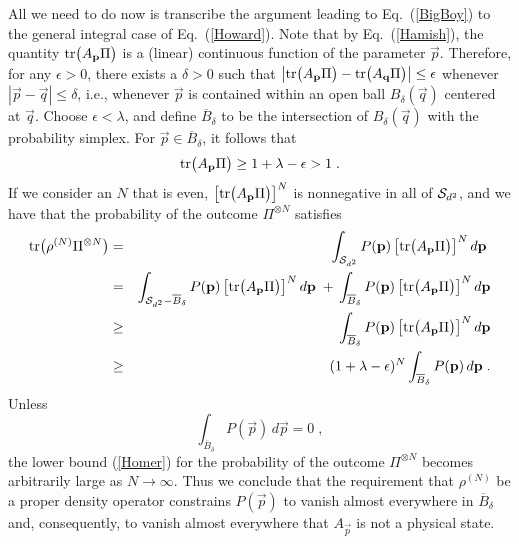 All we need to do now is transcribe the argument leading to
Eq.~(\ref{BigBoy}) to the general integral case of
Eq.~(\ref{Howard}). Note that by Eq.~(\ref{Hamish}), the quantity
${\rm tr}\big(A_{\vec{p}}\Pi\big)$ is a (linear) continuous
function of the parameter $\vec{p}$.  Therefore, for any
$\epsilon>0$, there exists a $\delta>0$ such that $\big|{\rm
tr}\big(A_{\vec{p}}\Pi\big)- {\rm
tr}\big(A_{\vec{q}}\Pi\big)\big|\le\epsilon$ whenever
$|\vec{p}-\vec{q}|\le\delta$, i.e., whenever $\vec{p}$ is
contained within an open ball $B_\delta(\vec{q})$ centered at
$\vec{q}$.  Choose $\epsilon<\lambda$, and define
$\overline{B}_\delta$ to be the intersection of
$B_\delta(\vec{q})$ with the probability simplex. For $\vec{p}\in
\overline{B}_\delta$, it follows that
\begin{equation}
{\rm tr}\big(A_{\vec{p}}\Pi\big)\ge 1+\lambda-\epsilon>1\;.
\end{equation}
If we consider an $N$ that is even, $\big[{\rm
tr}\big(A_{\vec{p}}\Pi\big)\big]^N$ is nonnegative in all of
${\cal S}_{d^2}$, and we have that the probability of the outcome
$\Pi^{\otimes N}$ satisfies
\begin{eqnarray}
{\rm tr}\big(\rho^{(N)}\Pi^{\otimes N}\big)
&=&
\int_{{\cal S}_{d^2}} P(\vec{p})\,\big[{\rm
tr}\big(A_{\vec{p}}\Pi\big)\big]^N \,d\vec{p}\;
\nonumber\\
&=&
\int_{{\cal S}_{d^2}-\overline{B}_\delta} P(\vec{p})\,\big[{\rm
tr}\big(A_{\vec{p}}\Pi\big)\big]^N \,d\vec{p}
\; +\, \int_{\overline{B}_\delta} P(\vec{p})\,\big[{\rm
tr}\big(A_{\vec{p}}\Pi\big)\big]^N \,d\vec{p}
\nonumber\\
&\ge&
\int_{\overline{B}_\delta} P(\vec{p})\,\big[{\rm
tr}\big(A_{\vec{p}}\Pi\big)\big]^N \,d\vec{p}
\nonumber\\
&\ge&
(1+\lambda-\epsilon)^N \int_{\overline{B}_\delta}
P(\vec{p})\,d\vec{p}\;.
\label{Homer}
\end{eqnarray}
Unless
\begin{equation}
\int_{\overline{B}_\delta} P(\vec{p})\,d\vec{p}=0\;,
\end{equation}
the lower bound (\ref{Homer}) for the probability of the outcome
$\Pi^{\otimes N}$ becomes arbitrarily large as
$N\rightarrow\infty$.  Thus we conclude that the requirement that
$\rho^{(N)}$ be a proper density operator constrains $P(\vec{p})$
to vanish almost everywhere in $\overline{B}_\delta$ and,
consequently, to vanish almost everywhere that $A_{\vec{p}}$ is
not a physical state.

